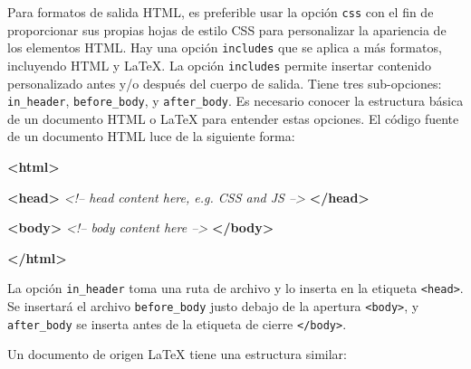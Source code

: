 \documentclass[12pt,]{krantz}
\makeatletter
\newenvironment{Shaded}{\begin{snugshade}}{\end{snugshade}}
\newcommand{\KeywordTok}[1]{\textcolor[rgb]{0.13,0.29,0.53}{\textbf{#1}}}
\newcommand{\CommentTok}[1]{\textcolor[rgb]{0.56,0.35,0.01}{\textit{#1}}}
\newcommand{\BuiltInTok}[1]{#1}
\newcommand{\ExtensionTok}[1]{#1}
\newcommand{\NormalTok}[1]{#1}
\newenvironment{kframe}{%
\medskip{}
\setlength{\fboxsep}{.8em}
 \def\at@end@of@kframe{}%
 \ifinner\ifhmode%
  \def\at@end@of@kframe{\end{minipage}}%
  \begin{minipage}{\columnwidth}%
 \fi\fi%
 \def\FrameCommand##1{\hskip\@totalleftmargin \hskip-\fboxsep
 \colorbox{shadecolor}{##1}\hskip-\fboxsep
     \hskip-\linewidth \hskip-\@totalleftmargin \hskip\columnwidth}%
 \MakeFramed {\advance\hsize-\width
   \@totalleftmargin\z@ \linewidth\hsize
   \@setminipage}}%
 {\par\unskip\endMakeFramed%
 \at@end@of@kframe}
\renewenvironment{Shaded}{\begin{kframe}}{\end{kframe}}
\theoremstyle{definition}
\theoremstyle{definition}
\theoremstyle{definition}
\theoremstyle{remark}
\makeatother
\begin{document}
Para formatos de salida HTML, es preferible usar la opción \texttt{css}
con el fin de proporcionar sus propias hojas de estilo CSS para
personalizar la apariencia de los elementos HTML. Hay una opción
\texttt{includes} que se aplica a más formatos, incluyendo HTML y LaTeX.
La opción \texttt{includes} permite insertar contenido personalizado
antes y/o después del cuerpo de salida. Tiene tres sub-opciones:
\texttt{in\_header}, \texttt{before\_body}, y \texttt{after\_body}. Es
necesario conocer la estructura básica de un documento HTML o LaTeX para
entender estas opciones. El código fuente de un documento HTML luce de
la siguiente forma:

\begin{Shaded}
\begin{Highlighting}[]
\KeywordTok{<html>}
  
  \KeywordTok{<head>}
  \CommentTok{<!-- head content here, e.g. CSS and JS -->}
  \KeywordTok{</head>}
  
  \KeywordTok{<body>}
  \CommentTok{<!-- body content here -->}
  \KeywordTok{</body>}

\KeywordTok{</html>}
\end{Highlighting}
\end{Shaded}

La opción \texttt{in\_header} toma una ruta de archivo y lo inserta en
la etiqueta \texttt{\textless{}head\textgreater{}}. Se insertará el
archivo \texttt{before\_body} justo debajo de la apertura
\texttt{\textless{}body\textgreater{}}, y \texttt{after\_body} se
inserta antes de la etiqueta de cierre
\texttt{\textless{}/body\textgreater{}}.

Un documento de origen LaTeX tiene una estructura similar:

\begin{Shaded}
\end{Shaded}
\end{document}
